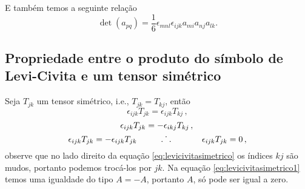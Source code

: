 E tamb\'em temos a seguinte rela\c{c}\~ao
\begin{equation}
\det(a_{pq})=\frac{1}{6}\epsilon_{mnl}\epsilon_{ijk}a_{mi}a_{nj}a_{lk}.
\end{equation}

\subsection{Propriedade entre o produto do s\'imbolo de Levi-Civita e um tensor sim\'etrico}
Seja $T_{jk}$ um tensor sim\'etrico, i.e., $T_{jk}=T_{kj}$, ent\~ao
\begin{equation}
  \epsilon_{ijk}T_{jk} = \epsilon_{ijk}T_{kj} \, ,%
\end{equation}
\begin{equation}  
  \epsilon_{ijk}T_{jk} = -\epsilon_{ikj}T_{kj} \, , 
  \label{eq:levicivitasimetrico} \\
\end{equation}
\begin{equation}
  \epsilon_{ijk}T_{jk} = -\epsilon_{ijk}T_{jk} \hspace{1cm}  \dot{.\hspace{.095in}.}\hspace{.5in}
  \epsilon_{ijk}T_{jk} = 0 \, ,
  \label{eq:levicivitasimetrico1}
\end{equation}
observe que no lado direito da equa\c{c}\~ao \ref{eq:levicivitasimetrico} os
\'indices $kj$ s\~ao mudos, portanto podemos troc\'a-los por $jk$. Na
equa\c{c}\~ao \ref{eq:levicivitasimetrico1} temos uma igualdade do tipo
$A=-A$, portanto $A$, s\'o pode ser igual a zero.


